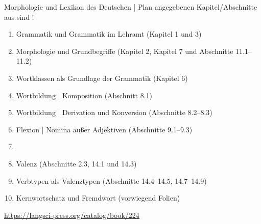   \begin{frame}
    {Morphologie und Lexikon des Deutschen | Plan}
     angegebenen Kapitel\slash Abschnitte aus  sind !\\
    \Halbzeile
    \begin{enumerate}
      \item Grammatik und Grammatik im Lehramt (Kapitel 1 und 3)
      \item Morphologie und Grundbegriffe (Kapitel 2, Kapitel 7 und Abschnitte 11.1--11.2)
      \item Wortklassen als Grundlage der Grammatik (Kapitel 6)
      \item Wortbildung | Komposition (Abschnitt 8.1)
      \item Wortbildung | Derivation und Konversion (Abschnitte 8.2--8.3)
      \item Flexion | Nomina außer Adjektiven (Abschnitte 9.1--9.3)
      \item {}
      \item Valenz (Abschnitte 2.3, 14.1 und 14.3)
      \item Verbtypen als Valenztypen (Abschnitte 14.4--14.5, 14.7--14.9) 
      \item Kernwortschatz und Fremdwort (vorwiegend Folien)
    \end{enumerate}
    \Halbzeile
    \centering 
    \url{https://langsci-press.org/catalog/book/224}
  \end{frame}
\fi
